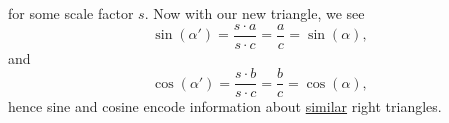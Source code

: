 \documentclass[handout,noauthor,nooutcomes,12pt,hints]{ximera}
\begin{document}
\begin{question}
\begin{freeResponse}
\begin{center}
    \end{center}
    for some scale factor $s$. Now with our new triangle, we see
    \[
    \sin(\alpha') = \frac{s\cdot a}{s\cdot c} = \frac{a}{c} =
    \sin(\alpha),
    \]
    and
    \[
    \cos(\alpha') = \frac{s\cdot b}{s\cdot c} = \frac{b}{c} =
    \cos(\alpha),
    \]
    hence sine and cosine encode information about \underline{similar} right
    triangles.
  \end{freeResponse}
\end{question}
\mynewpage
\end{document}
